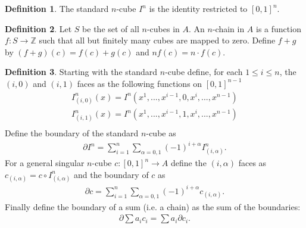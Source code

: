 \documentclass[20pt]{article}
\theoremstyle{plain}
\theoremstyle{definition}
\newtheorem{definition}{Definition}
\newcommand{\integers}{\mathbb{Z}}
\begin{document}
\begin{definition}
  The standard $n$-cube $I^n$ is the identity restricted to $[0, 1]^n$.
\end{definition}

\begin{definition}
  Let $S$ be the set of all $n$-cubes in $A$.  An $n$-chain in $A$ is a function
  $f: S \to \integers$ such that all but finitely many cubes are mapped to zero.
  Define $f + g$ by $(f+g)(c) = f(c) + g(c)$ and $nf(c) = n \cdot f(c)$.
\end{definition}

\begin{definition}
  Starting with the standard $n$-cube define, for each 
  $1 \leq i \leq n$, the $(i, 0)$ and $(i, 1)$ faces as the following
  functions on $[0, 1]^{n-1}$
  \begin{align*}
    I^n_{(i,0)}(x) = I^n(x^1, ..., x^{i-1}, 0, x^i, ..., x^{n-1}) \\
    I^n_{(i,1)}(x) = I^n(x^1, ..., x^{i-1}, 1, x^i, ..., x^{n-1}) \\
  \end{align*}
  Define the boundary of the standard $n$-cube as 
  \begin{align*}
    \partial I^n = \sum_{i=1}^n \sum_{\alpha = 0, 1} (-1)^{i + \alpha}I^n_{(i, \alpha)}.
  \end{align*}
  For a general singular $n$-cube $c: [0, 1]^n \to A$ define the $(i, \alpha)$ faces as 
  $c_{(i, \alpha)} = c \circ I^n_{(i, \alpha)}$
  and the boundary of $c$ as 
  \begin{align*}
    \partial c = \sum_{i=1}^n \sum_{\alpha = 0, 1} (-1)^{i + \alpha}c_{(i, \alpha)}.
  \end{align*}
  Finally define the boundary of a sum (i.e. a chain) as the sum of the boundaries:
  \begin{align*}
    \partial \sum a_ic_i = \sum a_i \partial c_i.
  \end{align*}
\end{definition}
\end{document}
